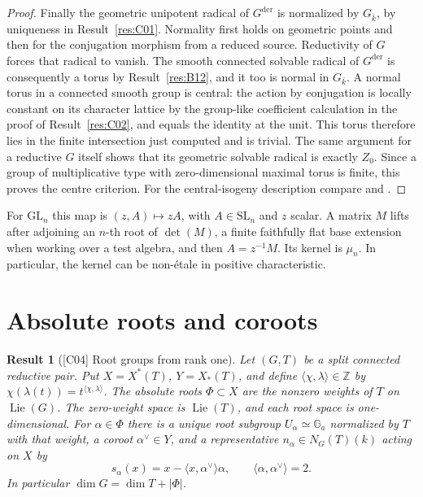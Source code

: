 \documentclass[11pt,a4paper,openany,oneside]{book}
\theoremstyle{resultstyle}
\newtheorem{statement}{Result}[chapter]
\newenvironment{result}[2]{\clubpenalty=10000\begin{statement}[\textnormal{[#1]} #2]\leavevmode\label{res:#1}\ignorespaces}{\end{statement}}
\theoremstyle{definition}
\numberwithin{equation}{chapter}
\newcommand{\Ga}{\mathbb{G}_a}
\newcommand{\GL}{\mathrm{GL}}
\newcommand{\SL}{\mathrm{SL}}
\DeclareMathOperator{\Lie}{Lie}
\newcommand{\ZZ}{\mathbb{Z}}
\begin{document}
\begin{proof}
Finally the geometric unipotent radical of \(G^{\mathrm{der}}\)
is normalized by \(G_{\bar k}\), by uniqueness in
Result~\ref{res:C01}. Normality first holds on geometric points
and then for the conjugation morphism from a reduced source.
Reductivity of \(G\) forces that radical to vanish. The smooth
connected solvable radical of \(G^{\mathrm{der}}\) is consequently
a torus by Result~\ref{res:B12}, and it too is normal in \(G_{\bar k}\).
A normal torus in a connected smooth group is central: the action
by conjugation is locally constant on its character lattice by
the group-like coefficient calculation in the proof of
Result~\ref{res:C02}, and equals the identity at the unit.
This torus therefore lies in the finite intersection just computed
and is trivial. The same argument for a reductive \(G\) itself
shows that its geometric solvable radical is exactly \(Z_0\).
Since a group of multiplicative type with zero-dimensional
maximal torus is finite, this proves the centre criterion.
For the central-isogeny description compare
\cite[Theorem 3.2.2]{conradfeng} and \cite[Chapter 19]{milne}.
\end{proof}

For \(\GL_n\) this map is \((z,A)\mapsto zA\), with \(A\in\SL_n\) and \(z\) scalar. A matrix \(M\) lifts after adjoining an \(n\)-th root of \(\det(M)\), a finite faithfully flat base extension when working over a test algebra, and then \(A=z^{-1}M\). Its kernel is \(\mu_n\). In particular, the kernel can be non-\'etale in positive characteristic.

\section{Absolute roots and coroots}

\begin{result}{C04}{Root groups from rank one}
Let \((G,T)\) be a split connected reductive pair. Put \(X=X^*(T)\), \(Y=X_*(T)\), and define \(\langle\chi,\lambda\rangle\in\ZZ\) by \(\chi(\lambda(t))=t^{\langle\chi,\lambda\rangle}\). The absolute roots \(\Phi\subset X\) are the nonzero weights of \(T\) on \(\Lie(G)\). The zero-weight space is \(\Lie(T)\), and each root space is one-dimensional. For \(\alpha\in\Phi\) there is a unique root subgroup \(U_\alpha\simeq\Ga\) normalized by \(T\) with that weight, a coroot \(\alpha^\vee\in Y\), and a representative \(n_\alpha\in N_G(T)(k)\) acting on \(X\) by
\[
 s_\alpha(x)=x-\langle x,\alpha^\vee\rangle\alpha,\qquad
 \langle\alpha,\alpha^\vee\rangle=2.
\]
In particular \(\dim G=\dim T+|\Phi|\).
\end{result}
\end{document}
